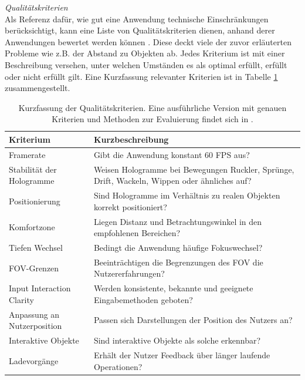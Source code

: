 \textit{Qualitätskriterien}\\
Als Referenz dafür, wie gut eine Anwendung technische Einschränkungen berücksichtigt, kann eine Liste von Qualitätskriterien dienen, anhand derer Anwendungen bewertet werden können \cite{MRDocQuality}. Diese deckt viele der zuvor erläuterten Probleme wie z.B. der Abstand zu Objekten ab. Jedes Kriterium ist mit einer Beschreibung versehen, unter welchen Umständen es als optimal erfüllt, erfüllt oder nicht erfüllt gilt. Eine Kurzfassung relevanter Kriterien ist in Tabelle \ref{tab:tech_criteria} zusammengestellt.\\
\bgroup
\setlength\extrarowheight{-2pt}
\def\arraystretch{1.8}
\begin{table}[H]
	\centering
	\begin{tabular}{m{2.3cm}|m{8.5cm}}
		Kriterium & Kurzbeschreibung \\
		\hline
		\hline
		Framerate & Gibt die Anwendung konstant 60 FPS aus?\\
		\hline
		Stabilität der Hologramme & Weisen Hologramme bei Bewegungen Ruckler, Sprünge, Drift, Wackeln, Wippen oder ähnliches auf?\\
		\hline
		Positionierung & Sind Hologramme im Verhältnis zu realen Objekten korrekt positioniert?\\
		\hline
		Komfortzone & Liegen Distanz und Betrachtungswinkel in den empfohlenen Bereichen?\\
		\hline
		Tiefen Wechsel & Bedingt die Anwendung häufige Fokuswechsel?\\
		\hline
		FOV-Grenzen & Beeinträchtigen die Begrenzungen des FOV die Nutzererfahrungen?\\
		\hline
		Input Interaction Clarity & Werden konsistente, bekannte und geeignete Eingabemethoden geboten?\\
		\hline
		Anpassung an Nutzerposition & Passen sich Darstellungen der Position des Nutzers an?\\
		\hline
		Interaktive Objekte & Sind interaktive Objekte als solche erkennbar?\\
		\hline
		Ladevorgänge  & Erhält der Nutzer Feedback über länger laufende Operationen?\\
	\end{tabular}\caption{\label{tab:tech_criteria} Kurzfassung der Qualitätskriterien. Eine ausführliche Version mit genauen Kriterien und Methoden zur Evaluierung findet sich in \cite{MRDocQuality}.}
\end{table}
\egroup

